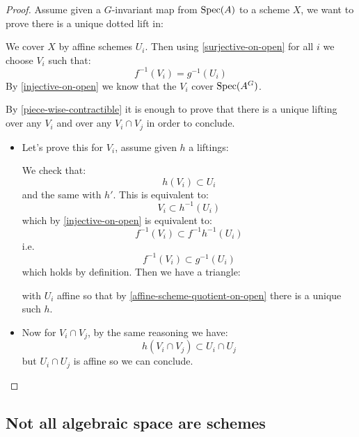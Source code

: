 \begin{proof}
Assume given a $G$-invariant map from $\operatorname{Spec}(A)$ to a scheme $X$, we want to prove there is a unique dotted lift in:
\begin{center}
\end{center}
We cover $X$ by affine schemes $U_i$. Then using \cref{surjective-on-open} for all $i$ we choose $V_i$ such that:
\[f^{-1}(V_i) = g^{-1}(U_i)\]
By \cref{injective-on-open} we know that the $V_i$ cover $\operatorname{Spec}(A^G)$. 

By \cref{piece-wise-contractible} it is enough to prove that there is a unique lifting over any $V_i$ and over any $V_i\cap V_j$ in order to conclude. 

\begin{itemize}

\item Let's prove this for $V_i$, assume given $h$ a liftings:
\begin{center}
\end{center}
We check that:
\[h(V_i) \subset U_i\] 
and the same with $h'$. This is equivalent to:
\[V_i \subset h^{-1}(U_i)\]
which by \cref{injective-on-open} is equivalent to:
\[f^{-1}(V_i)\subset f^{-1}h^{-1}(U_i)\]
i.e.
\[f^{-1}(V_i)\subset g^{-1}(U_i)\]
which holds by definition. Then we have a triangle:
\begin{center}
\end{center}
with $U_i$ affine so that by \cref{affine-scheme-quotient-on-open} there is a unique such $h$.

\item Now for $V_i\cap V_j$, by the same reasoning we have:
\[h(V_i\cap V_j) \subset U_i\cap U_j\] 
but $U_i\cap U_j$ is affine so we can conclude.
\end{itemize}

\end{proof}

\subsection{Not all algebraic space are schemes}

